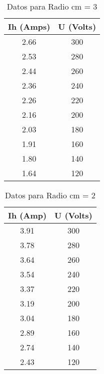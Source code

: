 \documentclass[a4paper,12pt]{report}
\begin{document}
\begin{table}[h]
    \centering
    \begin{tabular}{|c|c|}
        \hline
        \textbf{Ih (Amps)} & \textbf{U (Volts)} \\ \hline
        2.66 & 300 \\ \hline
        2.53 & 280 \\ \hline
        2.44 & 260 \\ \hline
        2.36 & 240 \\ \hline
        2.26 & 220 \\ \hline
        2.16 & 200 \\ \hline
        2.03 & 180 \\ \hline
        1.91 & 160 \\ \hline
        1.80 & 140 \\ \hline
        1.64 & 120 \\ \hline
    \end{tabular}
    \caption{Datos para Radio cm = 3}
\end{table}

\begin{table}[h]
    \centering
    \begin{tabular}{|c|c|}
        \hline
        \textbf{Ih (Amp)} & \textbf{U (Volts)} \\ \hline
      3.91 & 300 \\ \hline
      3.78 & 280 \\ \hline
      3.64 & 260 \\ \hline
      3.54 & 240 \\ \hline
      3.37 & 220 \\ \hline
      3.19 & 200 \\ \hline
      3.04 & 180 \\ \hline
      2.89 & 160 \\ \hline
      2.74 & 140 \\ \hline
      2.43 & 120 \\ \hline
    \end{tabular}
    \caption{Datos para Radio cm = 2}
\end{table}
\end{document}
